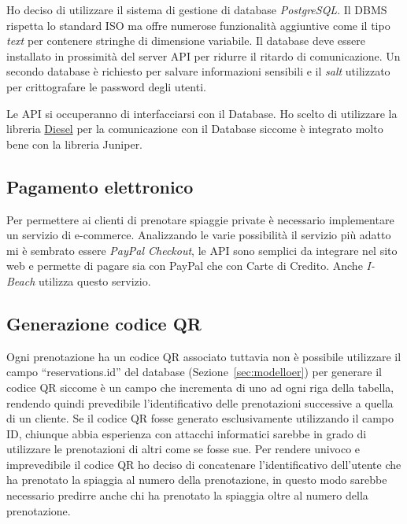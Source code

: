 Ho deciso di utilizzare il sistema di gestione di database \emph{PostgreSQL}. Il DBMS rispetta lo standard ISO ma offre numerose funzionalit\`a aggiuntive come il tipo \emph{text} per contenere stringhe di dimensione variabile. Il database deve essere installato in prossimit\`a del server API per ridurre il ritardo di comunicazione. Un secondo database \`e richiesto per salvare informazioni sensibili e il \emph{salt} utilizzato per crittografare le password degli utenti.

Le API si occuperanno di interfacciarsi con il Database. Ho scelto di utilizzare la libreria \href{https://diesel.rs/}{Diesel} per la comunicazione con il Database siccome \`e integrato molto bene con la libreria Juniper.

\subsection{Pagamento elettronico}%
\label{sub:pagamento_elettronico}

Per permettere ai clienti di prenotare spiaggie private \`e necessario implementare un servizio di e-commerce. Analizzando le varie possibilit\`a il servizio pi\`u adatto mi \`e sembrato essere \emph{PayPal Checkout}, le API sono semplici da integrare nel sito web e permette di pagare sia con PayPal che con Carte di Credito. Anche \emph{I-Beach} utilizza questo servizio.

\subsection{Generazione codice QR}

Ogni prenotazione ha un codice QR associato tuttavia non \`e possibile utilizzare il campo ``reservations.id'' del database (Sezione~\ref{sec:modelloer}) per generare il codice QR siccome \`e un campo che incrementa di uno ad ogni riga della tabella, rendendo quindi prevedibile l'identificativo delle prenotazioni successive a quella di un cliente. Se il codice QR fosse generato esclusivamente utilizzando il campo ID, chiunque abbia esperienza con attacchi informatici sarebbe in grado di utilizzare le prenotazioni di altri come se fosse sue. Per rendere univoco e imprevedibile il codice QR ho deciso di concatenare l'identificativo dell'utente che ha prenotato la spiaggia al numero della prenotazione, in questo modo sarebbe necessario predirre anche chi ha prenotato la spiaggia oltre al numero della prenotazione.

